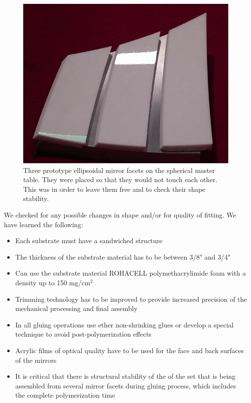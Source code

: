 \begin{figure}[h]
    \centering
    \includegraphics[width=1.0\linewidth]{images/Prototype.png}
    \caption{Three prototype ellipsoidal mirror facets on the spherical master table. They were placed so that they would not touch each other. This was in order to leave them free and to check their shape stability.}
    \label{fig:Prototype}
\end{figure}
We checked for any possible changes in shape and/or for quality of fitting. We have learned the following:

\begin{itemize}
    \item Each substrate must have a sandwiched structure
    \item The thickness of the substrate material has to be between 3/8" and 3/4"
    \item Can use the substrate material ROHACELL polymethacrylimide foam with a density up to 150 mg/cm$^2$
    \item Trimming technology has to be improved to provide increased precision of the mechanical processing and final assembly
    \item In all gluing operations use ether non-shrinking glues or develop a special technique to avoid post-polymerization effects
    \item Acrylic films of optical quality have to be used for the face and back surfaces of the mirrors
    \item It is critical that there is structural stability of the of the set that is being assembled from several mirror facets during gluing process, which includes the complete polymerization time
    \end{itemize}

